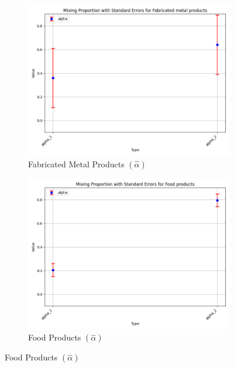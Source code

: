 \documentclass{article}
\begin{document}
\begin{figure}[ht!]
    \centering 
    \caption{AR(1) Normal Model }
    \begin{subfigure}[t]{0.32\textwidth}
        \centering
        \includegraphics[width=\textwidth]{figure/empirical_ar1_normal_alpha_with_error_bars_Fabricated metal products.png}
        \caption{Fabricated Metal Products $(\hat\alpha)$}
    \end{subfigure}
    \begin{subfigure}[t]{0.32\textwidth}
        \centering
        \includegraphics[width=\textwidth]{figure/empirical_ar1_normal_alpha_with_error_bars_Food products.png}
        \caption{Food Products  $(\hat\alpha)$}

\end{subfigure}
\end{figure}
\end{document}
